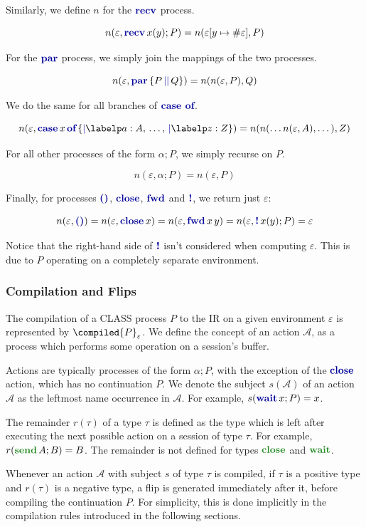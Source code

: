 Similarly, we define $n$ for the $\recvp$ process.

$$
    n(\varepsilon, \recvc{x}{y}{P}) = n(\varepsilon[y \mapsto \#\varepsilon], P)
$$

For the $\parp$ process, we simply join the mappings of the two processes.

$$
    n(\varepsilon, \parc{P}{Q}) = n(n(\varepsilon, P), Q)
$$

We do the same for all branches of $\casep$.

$$
    n(\varepsilon, \casec{x}{\labelc{a}{A},\,\dots,\,\labelc{z}{Z}}) = n(n(\dots n(\varepsilon, A), \dots), Z)
$$

For all other processes of the form $\alpha; P$, we simply recurse on $P$.

$$
    n(\varepsilon, \alpha; P) = n(\varepsilon, P)
$$

Finally, for processes $\emptyp$, $\closep$, $\fwdp$ and $\bangp$, we return just $\varepsilon$:

$$
    n(\varepsilon, \emptyc) = n(\varepsilon, \closec{x}) = n(\varepsilon, \fwdc{x}{y}) = n(\varepsilon, \bangc{x}{y}{P}) = \varepsilon
$$

Notice that the right-hand side of $\bangp$ isn't considered when computing $\varepsilon$. This is due to $P$ operating on a completely separate environment.

\subsubsection{Compilation and Flips}

The compilation of a CLASS process $P$ to the IR on a given environment $\varepsilon$ is represented by $\compiled{P}_\varepsilon$. We define the concept of an action $\mathcal{A}$, as a process which performs some operation on a session's buffer.

Actions are typically processes of the form $\alpha; P$, with the exception of the $\closep$ action, which has no continuation $P$. We denote the subject $s(\mathcal{A})$ of an action $\mathcal{A}$ as the leftmost name occurrence in $\mathcal{A}$. For example, $s(\waitc{x}{P}) = x$.

The remainder $r(\tau)$ of a type $\tau$ is defined as the type which is left after executing the next possible action on a session of type $\tau$. For example, $r(\sendt{A}{B}) = B$. The remainder is not defined for types $\closet{}$ and $\waitt{}$.

Whenever an action $\mathcal{A}$ with subject $s$ of type $\tau$ is compiled, if $\tau$ is a positive type and $r(\tau)$ is a negative type, a flip is generated immediately after it, before compiling the continuation $P$. For simplicity, this is done implicitly in the compilation rules introduced in the following sections.

